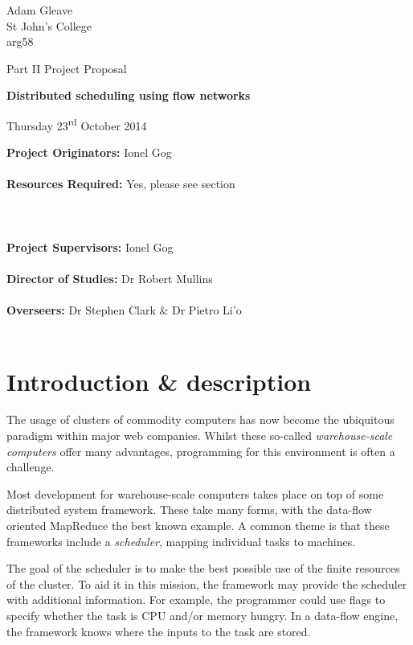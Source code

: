 \begin{flushright}
	\small {
		Adam Gleave \\
		St John's College \\
		arg58
	}
\end{flushright}

\vfill

\centerline{\Large Part II Project Proposal}
\vspace{0.4in}
\centerline{\LARGE \textbf{Distributed scheduling using flow networks}}
\vspace{0.4in}
\centerline{\large Thursday 23\textsuperscript{rd} October 2014}

\vfill

\textbf{Project Originators:} Ionel Gog \hfil \\ \\
\textbf{Resources Required:} Yes, please see section~ \hfil \\ \\ \\ \\
\textbf{Project Supervisors:} Ionel Gog \hfil \\ \\
\textbf{Director of Studies:} Dr Robert Mullins \hfil \\ \\
\textbf{Overseers:} Dr Stephen Clark \& Dr Pietro Li\a'o \hfil \\ \\

\vfil 

\section*{Introduction \& description}

The usage of clusters of commodity computers has now become the ubiquitous paradigm within major web companies. Whilst these so-called \emph{warehouse-scale computers} offer many advantages, programming for this environment is often a challenge.

Most development for warehouse-scale computers takes place on top of some distributed system framework. These take many forms, with the data-flow oriented MapReduce the best known example. A common theme is that these frameworks include a \emph{scheduler}, mapping individual tasks to machines. 

The goal of the scheduler is to make the best possible use of the finite resources of the cluster. To aid it in this mission, the framework may provide the scheduler with additional information. For example, the programmer could use flags to specify whether the task is CPU and/or memory hungry. In a data-flow engine, the framework knows where the inputs to the task are stored.

